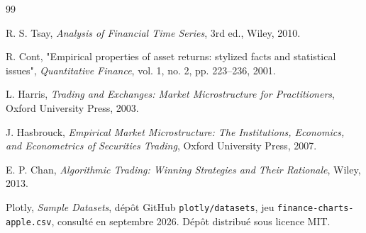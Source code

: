 \begin{thebibliography}{99}

R. S. Tsay, \emph{Analysis of Financial Time Series}, 3rd ed., Wiley, 2010.

R. Cont, "Empirical properties of asset returns: stylized facts and statistical issues", \emph{Quantitative Finance}, vol. 1, no. 2, pp. 223--236, 2001.

L. Harris, \emph{Trading and Exchanges: Market Microstructure for Practitioners}, Oxford University Press, 2003.

J. Hasbrouck, \emph{Empirical Market Microstructure: The Institutions, Economics, and Econometrics of Securities Trading}, Oxford University Press, 2007.

E. P. Chan, \emph{Algorithmic Trading: Winning Strategies and Their Rationale}, Wiley, 2013.

Plotly, \emph{Sample Datasets}, dépôt GitHub \texttt{plotly/datasets}, jeu \texttt{finance-charts-apple.csv}, consulté en septembre 2026. Dépôt distribué sous licence MIT.

\end{thebibliography}
